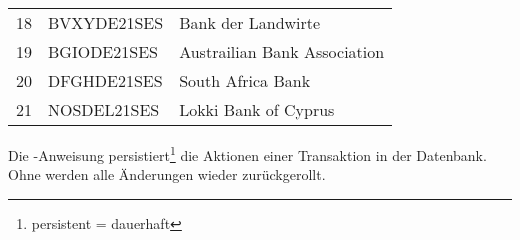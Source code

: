           \begin{center}
            \begin{small}
              \tablehead{}
              \tabletail {
              }
              \begin{msoraclesql}
                \begin{supertabular}{rll}
                  18 & BVXYDE21SES & Bank der Landwirte \\
                  19 & BGIODE21SES & Austrailian Bank Association \\
                  20 & DFGHDE21SES & South Africa Bank \\
                  21 & NOSDEL21SES & Lokki Bank of Cyprus  \\
                \end{supertabular}
              \end{msoraclesql}
            \end{small}
          \end{center}
          \begin{merke}
            Die \COMMIT-Anweisung persistiert\footnote{persistent = dauerhaft}
  					die Aktionen einer Transaktion in der Datenbank. Ohne \COMMIT{} werden alle
  					\"Anderungen wieder zur\"uckgerollt.
          \end{merke}
